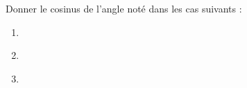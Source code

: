 
\begin{exercice}\label{exo2smath-0114}

Donner le cosinus de l'angle noté dans les cas suivants :
\begin{enumerate}
    \item
        
\begin{center}                                                                                            
   
\end{center}                                                                                                                             
\item

\begin{center}
   
\end{center}
\item

\begin{center}
   
\end{center}

\end{enumerate}


\end{exercice}
